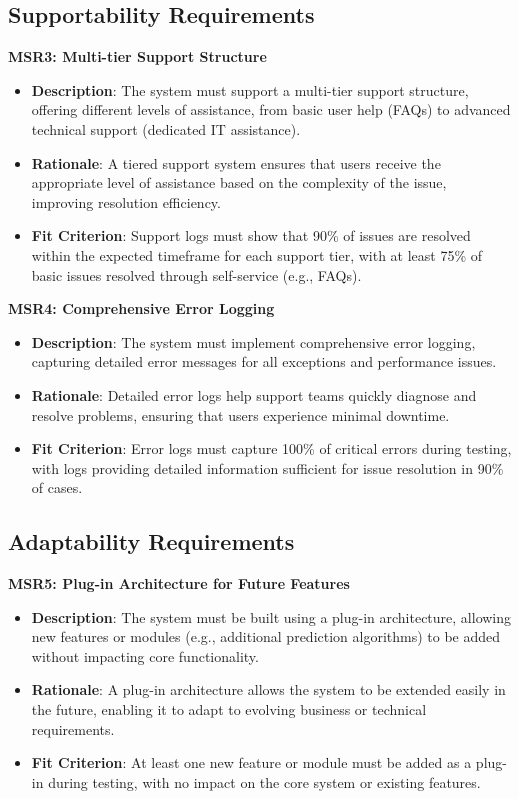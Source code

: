 \documentclass[12pt]{article}
\begin{document}
\subsection{Supportability Requirements}
\textbf{MSR3: Multi-tier Support Structure}
\begin{itemize}
    \item \textbf{Description}: The system must support a multi-tier support
    structure, offering different levels of assistance, from basic user help
    (FAQs) to advanced technical support (dedicated IT assistance).
    \item \textbf{Rationale}: A tiered support system ensures that users receive
    the appropriate level of assistance based on the complexity of the issue,
    improving resolution efficiency.
    \item \textbf{Fit Criterion}: Support logs must show that 90\% of issues are
    resolved within the expected timeframe for each support tier, with at least
    75\% of basic issues resolved through self-service (e.g., FAQs).
\end{itemize}
\textbf{MSR4: Comprehensive Error Logging}
\begin{itemize}
    \item \textbf{Description}: The system must implement comprehensive error
    logging, capturing detailed error messages for all exceptions and
    performance issues.
    \item \textbf{Rationale}: Detailed error logs help support teams quickly
    diagnose and resolve problems, ensuring that users experience minimal
    downtime.
    \item \textbf{Fit Criterion}: Error logs must capture 100\% of critical
    errors during testing, with logs providing detailed information sufficient
    for issue resolution in 90\% of cases.
\end{itemize}

\subsection{Adaptability Requirements}
\textbf{MSR5: Plug-in Architecture for Future Features}
\begin{itemize}
    \item \textbf{Description}: The system must be built using a plug-in
    architecture, allowing new features or modules (e.g., additional prediction
    algorithms) to be added without impacting core functionality.
    \item \textbf{Rationale}: A plug-in architecture allows the system to be
    extended easily in the future, enabling it to adapt to evolving business or
    technical requirements.
    \item \textbf{Fit Criterion}: At least one new feature or module must be
    added as a plug-in during testing, with no impact on the core system or
    existing features.
\end{itemize}
\end{document}
